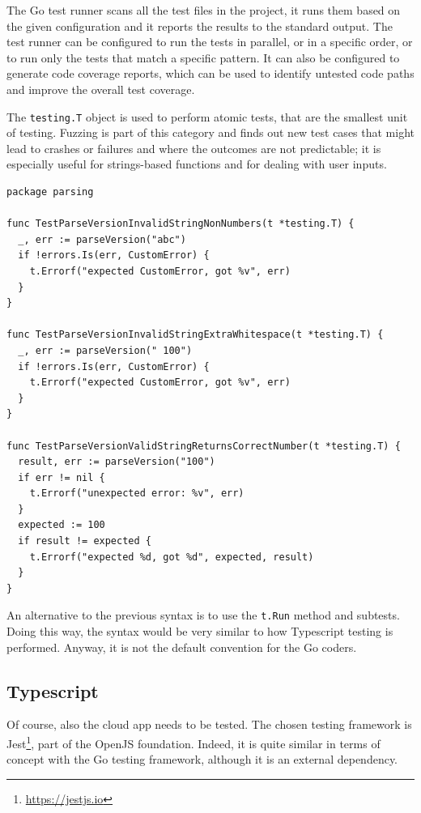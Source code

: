 The Go test runner scans all the test files in the project, it runs them based on the given configuration and it reports the results to the standard output. The test runner can be configured to run the tests in parallel, or in a specific order, or to run only the tests that match a specific pattern. It can also be configured to generate code coverage reports, which can be used to identify untested code paths and improve the overall test coverage.

The \texttt{testing.T} object is used to perform atomic tests, that are the smallest unit of testing. Fuzzing is part of this category and finds out new test cases that might lead to crashes or failures and where the outcomes are not predictable; it is especially useful for strings-based functions and for dealing with user inputs.

\begin{lstlisting}[language=Golang, caption={Go testing framework example file parsing\_test.go}]
package parsing

func TestParseVersionInvalidStringNonNumbers(t *testing.T) {
  _, err := parseVersion("abc")
  if !errors.Is(err, CustomError) {
    t.Errorf("expected CustomError, got %v", err)
  }
}

func TestParseVersionInvalidStringExtraWhitespace(t *testing.T) {
  _, err := parseVersion(" 100")
  if !errors.Is(err, CustomError) {
    t.Errorf("expected CustomError, got %v", err)
  }
}

func TestParseVersionValidStringReturnsCorrectNumber(t *testing.T) {
  result, err := parseVersion("100")
  if err != nil {
    t.Errorf("unexpected error: %v", err)
  }
  expected := 100
  if result != expected {
    t.Errorf("expected %d, got %d", expected, result)
  }
}
\end{lstlisting}

An alternative to the previous syntax is to use the \texttt{t.Run} method and subtests. Doing this way, the syntax would be very similar to how Typescript testing is performed. Anyway, it is not the default convention for the Go coders.

\subsection{Typescript}

Of course, also the cloud app needs to be tested. The chosen testing framework is Jest\footnote{\url{https://jestjs.io}}, part of the OpenJS foundation. Indeed, it is quite similar in terms of concept with the Go testing framework, although it is an external dependency.

